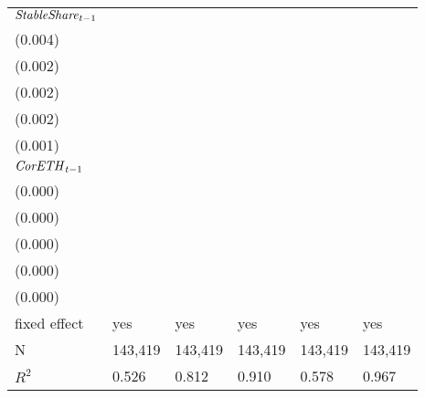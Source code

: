 \begin{tabular}{llllll}
${{\it StableShare}}_{t-1}$  &   \makecell{$0.144^{***}$ \\ (0.004)} &  \makecell{$-0.013^{***}$ \\ (0.002)} &  \makecell{$-0.006^{***}$ \\ (0.002)} &  \makecell{$0.100^{***}$ \\ (0.002)} &   \makecell{$0.011^{***}$ \\ (0.001)} \\
${{\it CorETH}}_{t-1}$       &      \makecell{$0.000^{}$ \\ (0.000)} &     \makecell{$0.000^{*}$ \\ (0.000)} &      \makecell{$0.000^{}$ \\ (0.000)} &    \makecell{$-0.000^{}$ \\ (0.000)} &     \makecell{$-0.000^{}$ \\ (0.000)} \\
\midrule fixed effect        &                                   yes &                                   yes &                                   yes &                                  yes &                                   yes \\
N                            &                               143,419 &                               143,419 &                               143,419 &                              143,419 &                               143,419 \\
$R^2$                        &                                 0.526 &                                 0.812 &                                 0.910 &                                0.578 &                                 0.967 \\
\bottomrule
\end{tabular}
